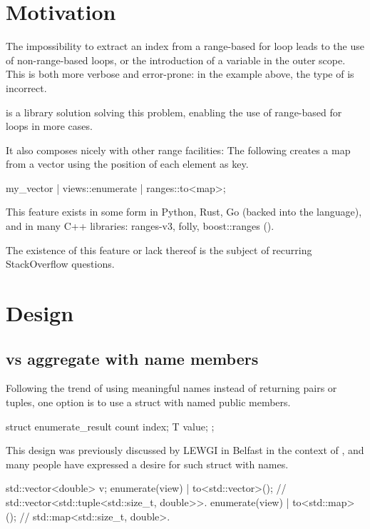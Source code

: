 \documentclass{wg21}
\begin{document}
\section{Motivation}

The impossibility to extract an index from a range-based for loop leads to the use of non-range-based  loops, or the introduction of a variable in the outer scope. This is both more verbose and error-prone: in the example above, the type of  is incorrect.

 is a library solution solving this problem, enabling the use of range-based for loops in more cases.

It also composes nicely with other range facilities:
The following creates a map from a vector using the position of each element as key.

\begin{colorblock}
my_vector | views::enumerate | ranges::to<map>;
\end{colorblock}

This feature exists in some form in Python, Rust, Go (backed into the language), and in many C++ libraries: ranges-v3, folly, boost::ranges ().


The existence of this feature or lack thereof is the subject of recurring StackOverflow questions.


\section{Design}

\subsection{ vs aggregate with name members}

Following the trend of using meaningful names instead of returning pairs or tuples, one option is to use a struct with named public members.
\begin{colorblock}
struct enumerate_result {
    count index;
    T value;
};
\end{colorblock}

This design was previously discussed by LEWGI in Belfast in the context of , and many people have expressed a desire for such struct with names.

\begin{colorblock}
std::vector<double> v;
enumerate(view) | to<std::vector>(); // std::vector<std::tuple<std::size_t, double>>.
enumerate(view) | to<std::map>();    // std::map<std::size_t, double>.
\end{colorblock}
\end{document}

